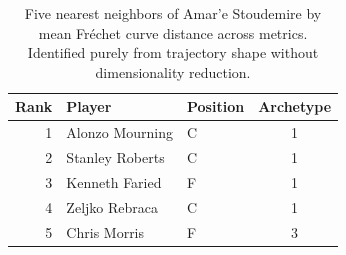 \begin{table}[htbp]
  \centering\small
  \begin{tabular}{rllc}
    \toprule
    Rank & Player & Position & Archetype \\
    \midrule
    1 & Alonzo Mourning & C & 1 \\
    2 & Stanley Roberts & C & 1 \\
    3 & Kenneth Faried & F & 1 \\
    4 & Zeljko Rebraca & C & 1 \\
    5 & Chris Morris & F & 3 \\
    \bottomrule
  \end{tabular}
  \caption{Five nearest neighbors of Amar'e Stoudemire by mean Fr\'{e}chet curve distance across metrics. Identified purely from trajectory shape without dimensionality reduction.}
  \label{tab:Amar_e_Stoudemire_frechet_curve_neighbors}
\end{table}

